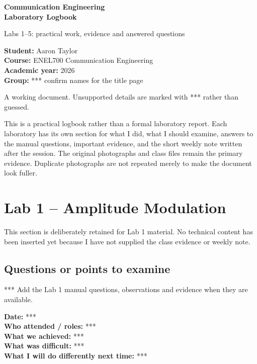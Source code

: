 \documentclass[11pt,a4paper]{article}
\newcommand{\weeklynote}[1]{\begin{notebox}#1\end{notebox}}
\newcommand{\labdivider}{\FloatBarrier\clearpage}
\begin{document}
\begin{titlepage}
\pagecolor{navy}\color{white}
\vspace*{25mm}
{\Huge\bfseries Communication Engineering\\[0.25em]Laboratory Logbook\par}
\vspace{8mm}
{\Large Labs 1--5: practical work, evidence and answered questions\par}
\vfill
\begin{tcolorbox}[colback=white,colframe=white,coltext=navy,boxrule=0.7pt,arc=3mm]
\Large\textbf{Student:} Aaron Taylor\\[0.4em]
\textbf{Course:} ENEL700 Communication Engineering\\[0.4em]
\textbf{Academic year:} 2026\\[0.4em]
\textbf{Group:} *** confirm names for the title page
\end{tcolorbox}
\vfill
{\large A working document. Unsupported details are marked with *** rather than guessed.\par}
\end{titlepage}
\nopagecolor\color{black}

\begin{evidencebox}
This is a practical logbook rather than a formal laboratory report. Each laboratory has its own section for what I did, what I should examine, answers to the manual questions, important evidence, and the short weekly note written after the session. The original photographs and class files remain the primary evidence. Duplicate photographs are not repeated merely to make the document look fuller.
\end{evidencebox}
\tableofcontents
\clearpage
\section{Lab 1 -- Amplitude Modulation}
\begin{placeholderbox}
This section is deliberately retained for Lab 1 material. No technical content has been inserted yet because I have not supplied the class evidence or weekly note.
\vspace{30mm}
\end{placeholderbox}
\subsection{Questions or points to examine}
\begin{checkbox}*** Add the Lab 1 manual questions, observations and evidence when they are available.\end{checkbox}
\weeklynote{\textbf{Date:} ***\\\textbf{Who attended / roles:} ***\\\textbf{What we achieved:} ***\\\textbf{What was difficult:} ***\\\textbf{What I will do differently next time:} ***\vspace{18mm}}
\labdivider
\end{document}
